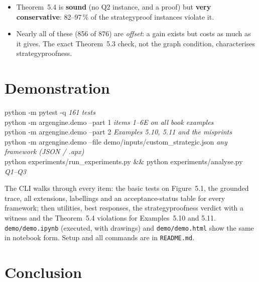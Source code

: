 \documentclass[10pt,a4paper]{article}
\newcommand{\code}[1]{\textcolor{brand!85!black}{\texttt{#1}}}
\begin{document}
\begin{keybox}[Q2 / Q3 -- findings]
\begin{itemize}
  \item Theorem~5.4 is \textbf{sound} (no Q2 instance, and a proof) but \textbf{very conservative}: 82--97\,\% of the
        strategyproof instances violate it.
  \item Nearly all of these (856 of 876) are \emph{offset}: a gain exists but costs as much as it gives. The exact
        Theorem~5.3 check, not the graph condition, characterises strategyproofness.
\end{itemize}
\end{keybox}

\section{Demonstration}\label{sec:demo}

\begin{codebox}
python -m pytest -q \hfill{\rmfamily\color{muted}\itshape 161 tests}\\
python -m argengine.demo --part 1 \hfill{\rmfamily\color{muted}\itshape items 1--6E on all book examples}\\
python -m argengine.demo --part 2 \hfill{\rmfamily\color{muted}\itshape Examples 5.10, 5.11 and the misprints}\\
python -m argengine.demo --file demo/inputs/custom\_strategic.json \hfill{\rmfamily\color{muted}\itshape any framework (JSON / .apx)}\\
python experiments/run\_experiments.py \&\& python experiments/analyse.py \hfill{\rmfamily\color{muted}\itshape Q1--Q3}
\end{codebox}

The CLI walks through every item: the basic tests on Figure~5.1, the grounded trace, all extensions, labellings and an
acceptance-status table for every framework; then utilities, best responses, the strategyproofness verdict with a witness
and the Theorem~5.4 violations for Examples~5.10 and 5.11. \code{demo/demo.ipynb} (executed, with drawings) and
\code{demo/demo.html} show the same in notebook form. Setup and all commands are in \code{README.md}.

\section{Conclusion}
\end{document}
